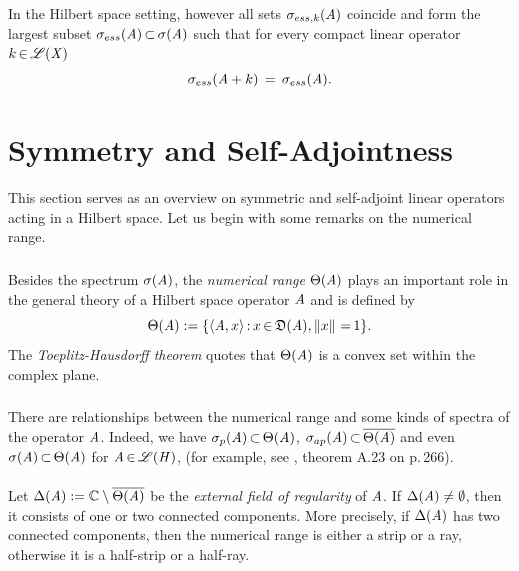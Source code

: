 \documentclass[11pt,twoside]{article}
\begin{document}
\subparagraph{}
In the Hilbert space setting,
however
all sets $\sigma_{ess,k}(\mathit{A})$ coincide and form the largest subset
$\sigma_{ess}(\mathit{A}) {\,\subset\,} \sigma(\mathit{A})$ such that
for every compact linear operator $k {\,\in\,} \mathscr{L}(\mathit{X})$ 
\[
\sigma_{ess}(\mathit{A} + k) \,=\, \sigma_{ess}(\mathit{A}).
\]

\section{Symmetry and Self-Adjointness}                                        %
This section serves as an overview on symmetric and self-adjoint linear
operators acting in a Hilbert space.
Let us begin with some remarks on the numerical range.

\subparagraph{} %
Besides the spectrum $\sigma(\mathit{A})$,
the \textit{numerical range} $\Theta(\mathit{A})$ plays an important role
in the general theory of a Hilbert space operator $\mathit{A}$ 
and is defined by
\[
\Theta(\mathit{A}) :=
\{ \langle \mathit{A},x \rangle {\,:\,} x {\,\in\,} \mathfrak{D}(\mathit{A}), \left\lVert x \right\rVert {\,=\,} 1 \}.
\]
The \textit{Toeplitz-Hausdorff theorem} quotes
that $\Theta(\mathit{A})$ is a convex set within the complex plane.

\subparagraph{} %
There are relationships between the numerical range
and some kinds of spectra of the operator $\mathit{A}$.
Indeed,
we have $\sigma_p(\mathit{A}) {\,\subset\,} \Theta(\mathit{A})$,
$\sigma_{ap}(\mathit{A}) {\,\subset\,} \overline{\Theta(\mathit{A})}$
and even $\sigma(\mathit{A}) {\,\subset\,} \Theta(\mathit{A})$ for $\mathit{A} {\,\in\,} \mathscr{L}(\mathit{H})$,
(for example, see \cite{Ha}, theorem A.23 on p.\,266).

\paragraph{} %
Let $\Delta(\mathit{A}) := {\mathbb{C}} \setminus \overline{\Theta(\mathit{A})}$
be the \textit{external field of regularity} of $\mathit{A}$.
If $\Delta(\mathit{A}) \neq \emptyset$,
then it consists of one or two connected components.
More precisely,
if $\Delta(\mathit{A})$ has two connected components,
then the numerical range is either a strip or a ray,
otherwise it is a half-strip or a half-ray.
\end{document}
